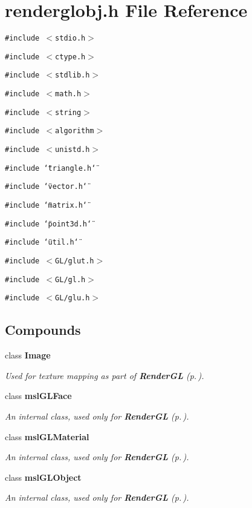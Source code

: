 \section{renderglobj.h File Reference}
\label{renderglobj_8h}
{\tt \#include $<$stdio.h$>$}\par
{\tt \#include $<$ctype.h$>$}\par
{\tt \#include $<$stdlib.h$>$}\par
{\tt \#include $<$math.h$>$}\par
{\tt \#include $<$string$>$}\par
{\tt \#include $<$algorithm$>$}\par
{\tt \#include $<$unistd.h$>$}\par
{\tt \#include \char`\"{}triangle.h\char`\"{}}\par
{\tt \#include \char`\"{}vector.h\char`\"{}}\par
{\tt \#include \char`\"{}matrix.h\char`\"{}}\par
{\tt \#include \char`\"{}point3d.h\char`\"{}}\par
{\tt \#include \char`\"{}util.h\char`\"{}}\par
{\tt \#include $<$GL/glut.h$>$}\par
{\tt \#include $<$GL/gl.h$>$}\par
{\tt \#include $<$GL/glu.h$>$}\par
\subsection*{Compounds}
\begin{CompactItemize}
\item 
class {\bf Image}
\begin{CompactList}\small\item\em Used for texture mapping as part of {\bf Render\-GL} {\rm (p.\,\pageref{classRenderGL})}.\item\end{CompactList}\item 
class {\bf msl\-GLFace}
\begin{CompactList}\small\item\em An internal class, used only for {\bf Render\-GL} {\rm (p.\,\pageref{classRenderGL})}.\item\end{CompactList}\item 
class {\bf msl\-GLMaterial}
\begin{CompactList}\small\item\em An internal class, used only for {\bf Render\-GL} {\rm (p.\,\pageref{classRenderGL})}.\item\end{CompactList}\item 
class {\bf msl\-GLObject}
\begin{CompactList}\small\item\em An internal class, used only for {\bf Render\-GL} {\rm (p.\,\pageref{classRenderGL})}.\item\end{CompactList}\end{CompactItemize}
